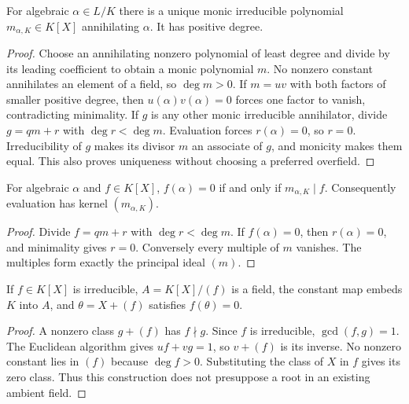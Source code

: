 \begin{theorem}
For algebraic $\alpha\in L/K$ there is a unique monic irreducible polynomial $m_{\alpha,K}\in K[X]$ annihilating $\alpha$. It has positive degree.
\end{theorem}
\begin{proof}
Choose an annihilating nonzero polynomial of least degree and divide by its leading coefficient to obtain a monic polynomial $m$. No nonzero constant annihilates an element of a field, so $\deg m>0$. If $m=uv$ with both factors of smaller positive degree, then $u(\alpha)v(\alpha)=0$ forces one factor to vanish, contradicting minimality. If $g$ is any other monic irreducible annihilator, divide $g=qm+r$ with $\deg r<\deg m$. Evaluation forces $r(\alpha)=0$, so $r=0$. Irreducibility of $g$ makes its divisor $m$ an associate of $g$, and monicity makes them equal. This also proves uniqueness without choosing a preferred overfield.
\end{proof}

\begin{proposition}
For algebraic $\alpha$ and $f\in K[X]$, $f(\alpha)=0$ if and only if $m_{\alpha,K}\mid f$. Consequently evaluation has kernel $(m_{\alpha,K})$.
\end{proposition}
\begin{proof}
Divide $f=qm+r$ with $\deg r<\deg m$. If $f(\alpha)=0$, then $r(\alpha)=0$, and minimality gives $r=0$. Conversely every multiple of $m$ vanishes. The multiples form exactly the principal ideal $(m)$.
\end{proof}

\begin{theorem}
If $f\in K[X]$ is irreducible, $A=K[X]/(f)$ is a field, the constant map embeds $K$ into $A$, and $\theta=X+(f)$ satisfies $f(\theta)=0$.
\end{theorem}
\begin{proof}
A nonzero class $g+(f)$ has $f\nmid g$. Since $f$ is irreducible, $\gcd(f,g)=1$. The Euclidean algorithm gives $uf+vg=1$, so $v+(f)$ is its inverse. No nonzero constant lies in $(f)$ because $\deg f>0$. Substituting the class of $X$ in $f$ gives its zero class. Thus this construction does not presuppose a root in an existing ambient field.
\end{proof}

